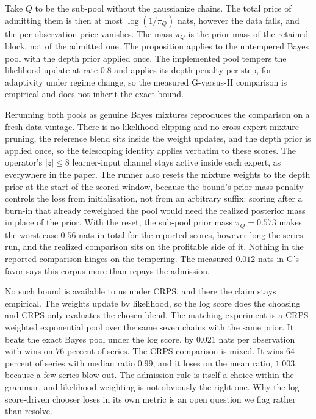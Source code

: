 \documentclass[11pt]{article}
\theoremstyle{remark}
\begin{document}
Take $Q$ to be the sub-pool without the gaussianize chains. The total price of
admitting them is then at most $\log(1/\pi_Q)$ nats, however the data falls, and the
per-observation price vanishes. The mass $\pi_Q$ is the prior mass of the retained
block, not of the admitted one. The proposition applies
to the untempered Bayes pool with the depth prior applied once. The implemented pool
tempers the likelihood update at rate $0.8$ and applies its depth penalty per step, for
adaptivity under regime change, so the measured G-versus-H comparison is empirical and
does not inherit the exact bound.

Rerunning both pools as genuine Bayes mixtures reproduces the comparison on a fresh
data vintage. There is no likelihood clipping and no cross-expert mixture pruning, the reference
blend sits inside the weight updates, and the depth prior is applied once, so the
telescoping identity applies verbatim to these scores. The operator's $|z| \le 8$
learner-input channel stays active inside each expert, as everywhere in the paper. The runner also resets the mixture weights to
the depth prior at the start of the scored window, because the bound's prior-mass
penalty controls the loss from initialization, not from an arbitrary suffix: scoring
after a burn-in that already reweighted the pool would need the realized posterior
mass in place of the prior. With the reset, the sub-pool prior mass
$\pi_Q = 0.573$ makes the worst case $0.56$ nats in total for the reported scores,
however long the series run, and the realized comparison sits on the profitable
side of it. Nothing
in the reported comparison hinges on the tempering. The measured $0.012$
nats in G's favor says this corpus more than repays the admission.

No such bound is available to us
under CRPS, and there the claim stays empirical. The
weights update by likelihood, so the log score does the choosing and CRPS only evaluates
the chosen blend. The matching experiment is a CRPS-weighted exponential pool over the
same seven chains with the same prior. It beats the exact Bayes pool under the log
score, by $0.021$ nats per observation with wins on $76$ percent of series. The CRPS
comparison is mixed. It wins $64$ percent of series with median ratio $0.99$, and it
loses on the mean ratio, $1.003$, because a few series blow out. The admission rule
is itself a choice within the grammar, and likelihood weighting is not obviously the
right one. Why the log-score-driven chooser loses in its own metric is an open
question we flag rather than resolve.
\end{document}
